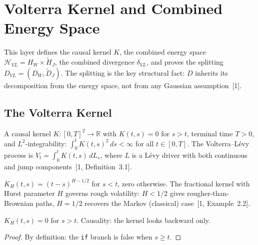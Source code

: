 %

\chapter{Volterra Kernel and Combined Energy Space}

This layer defines the causal kernel $K$, the combined energy space $\mathcal{H}_{VL} = H_W \times \tilde{H}_J$, the combined divergence $\delta_{VL}$, and proves the splitting $D_{VL} = (D_W, \tilde{D}_J)$. The splitting is the key structural fact: $D$ inherits its decomposition from the energy space, not from any Gaussian assumption~[1].

\section{The Volterra Kernel}

\begin{defn}\label{def:VolterraKernel}
\leanok
A causal kernel $K : [0,T]^2 \to \mathbb{R}$ with $K(t,s) = 0$ for $s > t$, terminal time $T > 0$, and $L^2$-integrability: $\int_0^t K(t,s)^2\,ds < \infty$ for all $t \in [0,T]$. The Volterra--L\'evy process is $V_t = \int_0^t K(t,s)\,dL_s$, where $L$ is a L\'evy driver with both continuous and jump components~[1, Definition~3.1].
\end{defn}

\begin{defn}\label{def:fractionalKernel}
\leanok
$K_H(t,s) = (t-s)^{H-1/2}$ for $s < t$, zero otherwise. The fractional kernel with Hurst parameter $H$ governs rough volatility: $H < 1/2$ gives rougher-than-Brownian paths, $H = 1/2$ recovers the Markov (classical) case~[1, Example~2.2].
\end{defn}

\begin{theorem}\label{thm:fractionalKernel_causal}
\leanok
{}
$K_H(t,s) = 0$ for $s > t$. Causality: the kernel looks backward only.
\end{theorem}
\begin{proof}\leanok By definition: the \texttt{if} branch is false when $s \geq t$.\end{proof}


